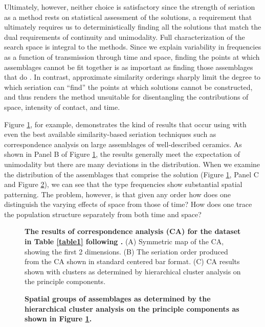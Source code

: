 \documentclass[10pt,letterpaper]{article}
\begin{document}
Ultimately, however, neither choice is satisfactory since the strength of seriation as a method rests on statistical assessment of the solutions, a requirement that ultimately requires us to deterministically finding all the solutions that match the dual requirements of continuity and unimodality. Full characterization of the search space is integral to the methods. Since we explain variability in frequencies as a function of transmission through time and space, finding the points at which assemblages cannot be fit together is as important as finding those assemblages that do \cite{Lipo1997Population,Lipo2008}. In contrast, approximate similarity orderings sharply limit the degree to which seriation can ``find'' the points at which solutions cannot be constructed, and thus renders the method unsuitable for disentangling the contributions of space, intensity of contact, and time. 

Figure \ref{fig1}, for example, demonstrates the kind of results that occur using with even the best available similarity-based seriation techniques such as correspondence analysis \cite{Bellanger2008,djindjian1984seriation,Peebles2012,Smith2005} on large assemblages of well-described ceramics. As shown in Panel B of Figure \ref{fig1}, the results generally meet the expectation of unimodality but there are many deviations in the distribution. When we examine the distribution of the assemblages that comprise the solution (Figure \ref{fig1}, Panel C and Figure \ref{fig2}), we can see that the type frequencies show substantial spatial patterning. The problem, however, is that given any order how does one distinguish the varying effects of space from those of time? How does one trace the population structure separately from both time and space?


\begin{figure}[h]
\caption{{\bf The results of correspondence analysis (CA) for the dataset in Table \ref{table1} following \cite{Alberti2013}.} (A) Symmetric map of the CA, showing the first 2 dimensions. (B) The seriation order produced from the CA shown in standard centered bar format. (C) CA results shown with clusters as determined by hierarchical cluster analysis on the principle components.}
\label{fig1}
\end{figure}

\begin{figure}[h]
\caption{{\bf Spatial groups of assemblages as determined by the hierarchical cluster analysis on the principle components as shown in Figure \ref{fig1}.}}
\label{fig2}
\end{figure}
\end{document}
